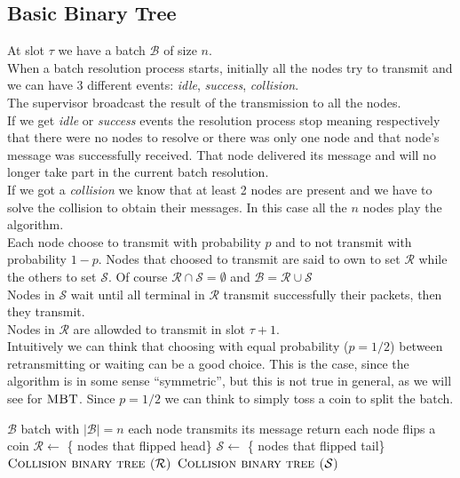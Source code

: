 \documentclass[12pt,a4paper]{report}
\newcommand{\algname}[1]{\ensuremath{\mbox{\sc #1}}}
\begin{document}
\subsection{Basic Binary Tree}
\label{basicbinarytreedescription}
At slot $\tau$ we have a batch $\mathcal{B}$ of size $n$.\\
When a batch resolution process starts, initially all the nodes try to transmit and we can have 3 different events: \emph{idle}, \emph{success}, \emph{collision}.	\\
The supervisor broadcast the result of the transmission to all the nodes.\\
If we get \emph{idle} or  \emph{success} events the resolution process stop meaning respectively that there were no nodes to resolve or there was only one node and that node's message was successfully received. That node delivered its message and will no longer take part in the current batch resolution.\\
If we got a \emph{collision} we know that at least 2 nodes are present and we have to solve the collision to obtain their messages. In this case all the $n$ nodes play the algorithm.\\
Each node choose to transmit with probability $p$ and to not transmit with probability $1-p$. Nodes that choosed to transmit  are said to own to set $\mathcal{R}$ while the others to set $\mathcal{S}$. Of course $\mathcal{R}  \cap \mathcal{S} = \emptyset$ and $\mathcal{B} = \mathcal{R}  \cup \mathcal{S}$\\
Nodes in $\mathcal{S}$ wait until all terminal in $\mathcal{R}$ transmit successfully their packets, then they transmit.\\
Nodes in $\mathcal{R}$ are allowded to transmit in slot $\tau +1$.\\


Intuitively we can think that choosing with equal probability ($p=1/2$) between retransmitting or waiting can be a good choice. This is the case, since the algorithm is in some sense ``symmetric'', but this is not true in general, as we will see for \algname{MBT}. Since $p=1/2$ we can think to simply toss a coin to split the batch.\\


\begin{algorithm}[h!]
\caption{\algname{Collision binary tree ($\mathcal{B}$)}}
\label{alg:binarytree}
\begin{algorithmic}
\STATE {}
\REQUIRE $\mathcal{B}$ batch with $|\mathcal{B}|=n$
\STATE each node transmits its message
	\STATE return
\ELSE
	\STATE each node flips a coin
	\STATE $\mathcal{R} \gets$ \{ nodes that flipped head\}
	\STATE $\mathcal{S} \gets$ \{ nodes that flipped tail\}
	\STATE \algname{Collision binary tree ($\mathcal{R}$)}
	\STATE \algname{Collision binary tree ($\mathcal{S}$)}
\ENDIF
\end{algorithmic}
\end{algorithm}
\end{document}
